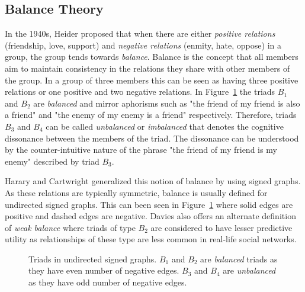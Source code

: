 \subsection{Balance Theory}
\label{sec:balance-theory}


In the 1940s, Heider \cite{heider1946attitudes} proposed  that when there are either \textit{positive relations} (friendship, love, support) and \textit{negative relations} (enmity, hate, oppose) in a group, the  group tends towards \textit{balance}. Balance is the concept that all members aim to maintain consistency in the relations they share with other members of the group. In a group of three members this can be seen as having three positive relations or one positive and two negative relations. In Figure~\ref{fig:undirected-triads} the triads $B_1$ and $B_2$ are \textit{balanced} and mirror aphorisms such as "the friend of my friend is also a friend" and "the enemy of my enemy is a friend" respectively. Therefore, triads $B_3$ and $B_4$ can be called \textit{unbalanced} or \textit{imbalanced} that denotes the cognitive dissonance between the members of the triad. The dissonance can be understood by the counter-intuitive nature of the phrase "the friend of my friend is my enemy" described by triad $B_3$.

Harary and Cartwright \cite{cartwright1956structural} generalized this notion of balance by using signed graphs. As these relations are typically symmetric, balance is usually defined for undirected signed graphs. This can been seen in Figure~\ref{fig:undirected-triads} where solid edges are positive and dashed edges are negative. Davies \cite{davis1963weakBalance} also offers an alternate definition of \textit{weak balance} where triads of type $B_2$ are considered to have lesser predictive utility as relationships of these type are less common in real-life social networks.

\begin{figure}[!ht]     
    \centering
      
    \caption{Triads in undirected signed graphs. $B_1$ and $B_2$ are \textit{balanced} triads as they have even number of negative edges. $B_3$ and $B_4$ are \textit{unbalanced} as they have odd number of negative edges.}
    \label{fig:undirected-triads}
\end{figure}

